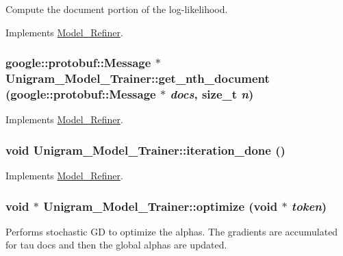 Compute the document portion of the log-\/likelihood. 



Implements \hyperlink{class_model___refiner_afc5cd8181d1f6fc3ebf0a6bad1d8f023}{Model\_\-Refiner}.

\hypertarget{class_unigram___model___trainer_a032b2dcd9676b5a7ced2dcb57d509c84}{
\subsubsection[{get\_\-nth\_\-document}]{\setlength{\rightskip}{0pt plus 5cm}google::protobuf::Message $\ast$ Unigram\_\-Model\_\-Trainer::get\_\-nth\_\-document (google::protobuf::Message $\ast$ {\em docs}, \/  size\_\-t {\em n})}}
\label{class_unigram___model___trainer_a032b2dcd9676b5a7ced2dcb57d509c84}


Implements \hyperlink{class_model___refiner_a6d3bb23a5d76951144004d61b2fdcbe7}{Model\_\-Refiner}.

\hypertarget{class_unigram___model___trainer_a8034a5fd2767a6869f87a82956e127d6}{
\subsubsection[{iteration\_\-done}]{\setlength{\rightskip}{0pt plus 5cm}void Unigram\_\-Model\_\-Trainer::iteration\_\-done ()}}
\label{class_unigram___model___trainer_a8034a5fd2767a6869f87a82956e127d6}


Implements \hyperlink{class_model___refiner_a570c3bd6742f609ba86d724e8f070f1a}{Model\_\-Refiner}.

\hypertarget{class_unigram___model___trainer_afaf685a22d603c7a0b44ed692a928c13}{
\subsubsection[{optimize}]{\setlength{\rightskip}{0pt plus 5cm}void $\ast$ Unigram\_\-Model\_\-Trainer::optimize (void $\ast$ {\em token})}}
\label{class_unigram___model___trainer_afaf685a22d603c7a0b44ed692a928c13}
Performs stochastic GD to optimize the alphas. The gradients are accumulated for tau docs and then the global alphas are updated. 

